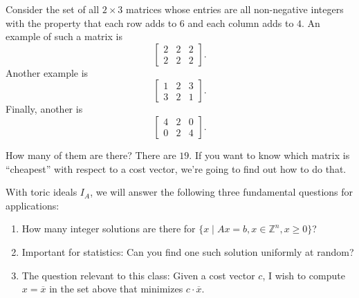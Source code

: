 \begin{example}{}{}
Consider the set of all $2 \times 3$ matrices whose entries are all non-negative integers with the property that each row adds to $6$ and each column adds to $4$. An example of such a matrix is
\[
\left[
\begin{array}{ccc}
2&2&2\\2&2&2
\end{array}
\right]
.\]
Another example is
\[
\left[
\begin{array}{ccc}
1&2&3 \\ 3 & 2&1
\end{array}
\right]
.\]
Finally, another is
\[
\left[
\begin{array}{ccc}
4&2&0\\0&2&4
\end{array}
\right]
.\]
\end{example}
How many of them are there? There are $19$. If you want to know which matrix is ``cheapest'' with respect to a cost vector, we're going to find out how to do that. 

With toric ideals $I_A$, we will answer the following three fundamental questions for applications:
\begin{enumerate}
\item How many integer solutions are there for $\{ x \mid Ax = b, x \in \mathbb{Z}^n, x \geq 0 \}$?
\item Important for statistics: Can you find one such solution uniformly at random?
\item The question relevant to this class: Given a cost vector $c$, I wish to compute $x=\overline{x}$ in the set above that minimizes $c \cdot \overline{x}$.
\end{enumerate}

